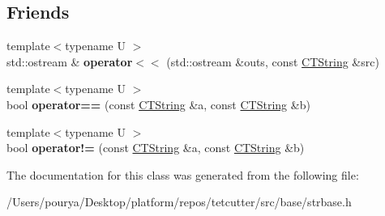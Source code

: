 \subsection*{Friends}
\begin{DoxyCompactItemize}
\item 
\hypertarget{classps_1_1base_1_1CTString_a17db055887928931a33d69fc13518bb9}{}{\footnotesize template$<$typename U $>$ }\\std\+::ostream \& {\bfseries operator$<$$<$} (std\+::ostream \&outs, const \hyperlink{classps_1_1base_1_1CTString}{C\+T\+String} \&src)\label{classps_1_1base_1_1CTString_a17db055887928931a33d69fc13518bb9}

\item 
\hypertarget{classps_1_1base_1_1CTString_a5a56ae5d6e02a9d2959b293cbe387ec0}{}{\footnotesize template$<$typename U $>$ }\\bool {\bfseries operator==} (const \hyperlink{classps_1_1base_1_1CTString}{C\+T\+String} \&a, const \hyperlink{classps_1_1base_1_1CTString}{C\+T\+String} \&b)\label{classps_1_1base_1_1CTString_a5a56ae5d6e02a9d2959b293cbe387ec0}

\item 
\hypertarget{classps_1_1base_1_1CTString_ac669f7df14173085ee723f2c9a1aad99}{}{\footnotesize template$<$typename U $>$ }\\bool {\bfseries operator!=} (const \hyperlink{classps_1_1base_1_1CTString}{C\+T\+String} \&a, const \hyperlink{classps_1_1base_1_1CTString}{C\+T\+String} \&b)\label{classps_1_1base_1_1CTString_ac669f7df14173085ee723f2c9a1aad99}

\end{DoxyCompactItemize}


The documentation for this class was generated from the following file\+:\begin{DoxyCompactItemize}
\item 
/\+Users/pourya/\+Desktop/platform/repos/tetcutter/src/base/strbase.\+h\end{DoxyCompactItemize}
